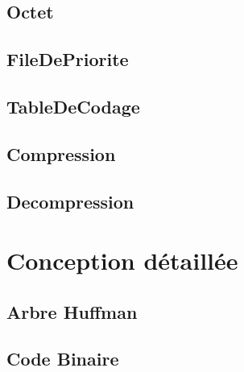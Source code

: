\documentclass{article}
\begin{document}


\subsection{\textbf{Octet}}



\subsection{\textbf{FileDePriorite}}



\subsection{\textbf{TableDeCodage}}



\subsection{\textbf{Compression}}



\subsection{\textbf{Decompression}}



\newpage

\section{Conception détaillée}

\subsection{\textbf{Arbre Huffman}}



\subsection{\textbf{Code Binaire}}


\end{document}
